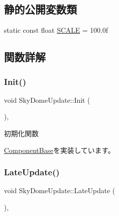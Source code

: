 \subsection*{静的公開変数類}
\begin{DoxyCompactItemize}
\item 
static const float \mbox{\hyperlink{class_sky_dome_update_a4c6750a54880db753cfe2a4ecfd24130}{S\+C\+A\+LE}} = 100.\+0f
\end{DoxyCompactItemize}


\subsection{関数詳解}
\mbox{\label{class_sky_dome_update_ab4fec6d13590c07e39e6e8b4f7f7613a}} 
\subsubsection{\texorpdfstring{Init()}{Init()}}
{\footnotesize\ttfamily void Sky\+Dome\+Update\+::\+Init (\begin{DoxyParamCaption}{ }\end{DoxyParamCaption})\hspace{0.3cm}{\ttfamily [override]}, {\ttfamily [virtual]}}



初期化関数 



\mbox{\hyperlink{class_component_base_a125939d6befe42f28886a6523e86b18b}{Component\+Base}}を実装しています。

\mbox{\label{class_sky_dome_update_a94347cb50b4dc13528738a7b812da261}} 
\subsubsection{\texorpdfstring{Late\+Update()}{LateUpdate()}}
{\footnotesize\ttfamily void Sky\+Dome\+Update\+::\+Late\+Update (\begin{DoxyParamCaption}{ }\end{DoxyParamCaption})\hspace{0.3cm}{\ttfamily [override]}, {\ttfamily [virtual]}}



